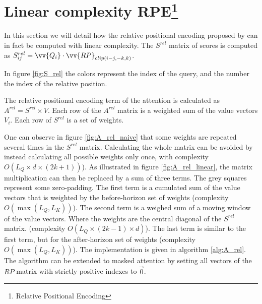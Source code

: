 \section{Linear complexity RPE\protect\footnote{Relative Positional Encoding}}

In this section we will detail how the relative positional encoding
 proposed by \citet{shaw2018selfattention}
can in fact be computed with linear complexity. The $S^{rel}$ matrix of scores is computed as
$S^{rel}_{ij} = \vv{Q_i} \cdot \vv{RP}_{clip(i-j, -k, k)}$.

In figure \ref{fig:S_rel} the colors represent the index of the query, and the number the
index of the relative position.

The relative positional encoding term of the attention is calculated as $A^{rel} = S^{rel} \times V$. Each row of the $A^{rel}$ matrix is a weighted sum of the value vectors $V_i$. Each row of $S^{rel}$ is a set of weights.

One can observe in figure \ref{fig:A_rel_naive} that some weights are repeated several times in the
$S^{rel}$ matrix. Calculating the whole matrix can be avoided by
instead calculating all possible weights only once, with complexity
$O \left(L_Q\times d\times(2k+1)\right)$). As illustrated in figure \ref{fig:A_rel_linear}, the matrix multiplication can then be replaced by a sum of three terms. The grey squares represent some zero-padding. The first term is a cumulated sum of the value vectors that is weighted  by the before-horizon set of weights (complexity $O(\max(L_Q, L_K))$). The second term is a weighed sum of a moving window of the value vectors. Where the weights are the central diagonal of the $S^{rel}$ matrix. (complexity $O(L_Q \times (2k-1) \times d)$). The last term is similar to the first term, but for the after-horizon set of weights (complexity $O(\max(L_Q, L_K))$). The implementation is given in algorithm \ref{alg:A_rel}. The algorithm can be extended to masked attention by setting all vectors of the $RP$ matrix with strictly positive indexes to $\vec{0}$.

\endinput
